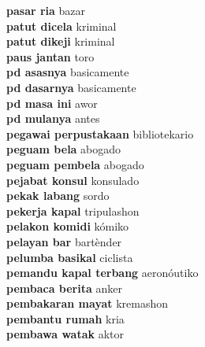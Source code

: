 \textbf{ pasar ria  } bazar \\
\textbf{ patut dicela  } kriminal \\
\textbf{ patut dikeji  } kriminal \\
\textbf{ paus jantan  } toro \\
\textbf{ pd asasnya  } basicamente \\
\textbf{ pd dasarnya  } basicamente \\
\textbf{ pd masa ini  } awor \\
\textbf{ pd mulanya  } antes \\
\textbf{ pegawai perpustakaan  } bibliotekario \\
\textbf{ peguam bela  } abogado \\
\textbf{ peguam pembela  } abogado \\
\textbf{ pejabat konsul  } konsulado \\
\textbf{ pekak labang  } sordo \\
\textbf{ pekerja kapal  } tripulashon \\
\textbf{ pelakon komidi  } kómiko \\
\textbf{ pelayan bar  } bartènder \\
\textbf{ pelumba basikal  } ciclista \\
\textbf{ pemandu kapal terbang  } aeronóutiko \\
\textbf{ pembaca berita  } anker \\
\textbf{ pembakaran mayat  } kremashon \\
\textbf{ pembantu rumah  } kria \\
\textbf{ pembawa watak  } aktor \\
